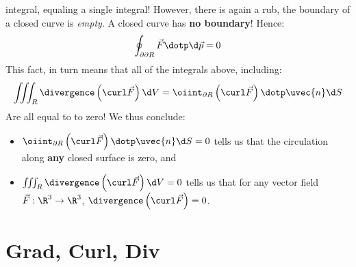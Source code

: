 \documentclass{ximera}
\begin{document}
integral, equaling a single integral! However, there is again a rub,
the boundary of a closed curve is \textit{empty}. A closed curve has
\textbf{no boundary}! Hence:
\[
\oint_{\partial\partial R} \vec{F}\dotp \d \vec{p} = 0
\]
This fact, in turn means that all of the integrals above, including:
\[
\iiint_R \divergence\left(\curl\vec{F}\right)\d V = \oiint_{\partial R} \left(\curl \vec{F}\right)\dotp \uvec{n} \d S
\]
Are all equal to to zero!  We thus conclude:
\begin{itemize}
\item $\oiint_{\partial R} \left(\curl \vec{F}\right)\dotp \uvec{n} \d
  S=0$ tells us that the circulation along \textbf{any} closed surface
  is zero, and
\item $\iiint_R \divergence\left(\curl\vec{F}\right)\d V = 0$ tells us
  that for any vector field $\vec{F}:\R^3\to\R^3$,
  $\divergence\left(\curl\vec{F}\right)=0$.
\end{itemize}



\section{Grad, Curl, Div}



  
\end{document}
